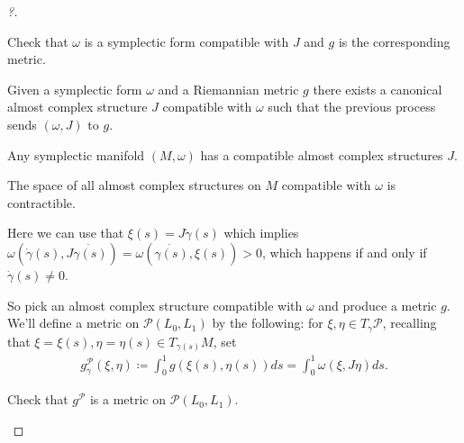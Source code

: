 \begin{proof}[?]
\begin{definition}

\end{definition}

\begin{exercise}[?]

Check that \(\omega\) is a symplectic form compatible with \(J\) and
\(g\) is the corresponding metric.

\end{exercise}

\begin{exercise}[?]

Given a symplectic form \(\omega\) and a Riemannian metric \(g\) there
exists a canonical almost complex structure \(J\) compatible with
\(\omega\) such that the previous process sends \((\omega, J)\) to
\(g\).

\end{exercise}

\begin{corollary}[?]

Any symplectic manifold \((M, \omega)\) has a compatible almost complex
structures \(J\).

\end{corollary}

\begin{theorem}[?]

The space of all almost complex structures on \(M\) compatible with
\(\omega\) is contractible.

\end{theorem}

Here we can use that \(\xi(s) = J \dot{ \gamma}(s)\) which implies
\(\omega( \dot{\gamma}(s), J \dot{\gamma(s)}) = \omega( \dot{ \gamma(s)}, \xi(s) ) > 0\),
which happens if and only if \(\dot{ \gamma}(s) \neq 0\).

So pick an almost complex structure compatible with \(\omega\) and
produce a metric \(g\). We'll define a metric on
\(\mathcal{P}(L_0, L_1)\) by the following: for
\(\xi, \eta \in T_{\gamma} \mathcal{P}\), recalling that
\(\xi = \xi(s), \eta = \eta(s) \in T_{\gamma(s)}M\), set
\begin{align*}
g_{\gamma}^\mathcal{P}( \xi, \eta) \coloneqq\int_0^1 g( \xi(s), \eta(s) ) ds = \int_0^1 \omega(\xi, J \eta) ds
.\end{align*}

\begin{exercise}[?]

Check that \(g^\mathcal{P}\) is a metric on \(\mathcal{P}(L_0, L_1)\).


\end{exercise}
\end{proof}
